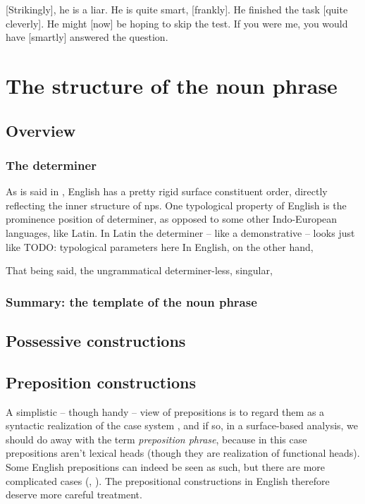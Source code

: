 \documentclass[UTF8, a4paper, oneside, scheme=plain]{ctexrep}
\newcommand*{\citepage}[1]{pp.~{#1}}
\newcommand*{\term}[1]{\emph{#1}}
\begin{document}
\begin{exe}
    \ex\label{ex:overview.adverb-1} [Strikingly], he is a liar.
    \ex\label{ex:overview.adverb-2} He is quite smart, [frankly].
    \ex\label{ex:overview.adverb-5} He finished the task [quite cleverly].
    \ex\label{ex:overview.adverb-3} He might [now] be hoping to skip the test.
    \ex\label{ex:overview.adverb-4} If you were me, you would have [smartly] answered the question.
\end{exe}


\chapter{The structure of the noun phrase}\label{chap:np}

\section{Overview}

\subsection{The determiner}

As is said in ,
English has a pretty rigid surface constituent order,
directly reflecting the inner structure of \acs{np}s.
One typological property of English is 
the prominence position of determiner,
as opposed to some other Indo-European languages, like Latin.
In Latin the determiner -- like a demonstrative -- 
looks just like TODO: typological parameters here 
In English, on the other hand, 

That being said, the ungrammatical determiner-less, singular, 

\subsection{Summary: the template of the noun phrase}

\section{Possessive constructions}

\section{Preposition constructions}

A simplistic -- though handy -- view of prepositions 
is to regard them as a syntactic realization of the case system
\citep[\citepage{49}]{dixon2009basic1},
and if so,
in a surface-based analysis,
we should do away with the term \term{preposition phrase},
because in this case prepositions aren't lexical heads
(though they are realization of functional heads).
Some English prepositions can indeed be seen as such,
but there are more complicated cases 
(, ).
The prepositional constructions in English therefore deserve more careful treatment.
\end{document}
